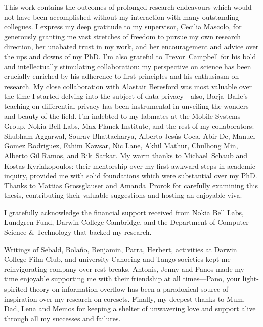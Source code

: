 
\begin{acknowledgements}
This work contains the outcomes of prolonged research endeavours which would not have been accomplished without my interaction with many outstanding collegues. I express my deep gratitude to my supervisor, Cecilia Mascolo, for generously granting me vast stretches of freedom to pursue my own research direction, her unabated trust in my work, and her encouragement and advice over the ups and downs of my PhD. I'm also grateful to \mbox{Trevor Campbell} for his bold and intellectually stimulating collaboration: my perspective on science has been crucially enriched by his adherence to first principles and his enthusiasm on research. My close collaboration with Alastair Beresford was most valuable over the time I started delving into the subject of data privacy---also, \mbox{Borja Balle's} teaching on differential privacy has been instrumental in unveiling the wonders and beauty of the field. I'm indebted to my labmates at the Mobile Systems Group, Nokia Bell Labs, Max Planck Institute, and the rest of my collaborators: Shubham Aggarwal, Sourav Bhattacharya, Alberto Jes\'{u}s Coca, Abir De, Manuel Gomez Rodriguez, Fahim Kawsar, Nic Lane,  Akhil Mathur, Chulhong Min, Alberto Gil Ramos, and \mbox{Rik Sarkar}. My warm thanks to \mbox{Michael Schaub} and Kostas Kyriakopoulos: their mentorship over my first awkward steps in academic inquiry, provided me with solid foundations which were substantial over my PhD. Thanks to Mattias Grossglauser and \mbox{Amanda Prorok} for carefully examining this thesis, contributing their valuable suggestions and hosting an enjoyable viva.

I gratefully acknowledge the financial support received from Nokia Bell Labs, Lundgren Fund, Darwin College Cambridge, and the Department of Computer Science \& Technology that backed my research. 

Writings of Sebald, Bola{\~{n}}o, Benjamin, Parra, Herbert, activities at Darwin College Film Club, and university Canoeing and Tango societies kept me reinvigorating company over rest breaks. Antonis, Jenny and Panos made my time enjoyable supporting me with their friendship at all times---Pano, your light-spirited theory on information overflow has been a paradoxical source of inspiration over my research on coresets. Finally, my deepest thanks to Mum, Dad, Lena and Memos for keeping a shelter of unwavering love and support alive through all my successes and failures.
\end{acknowledgements}
